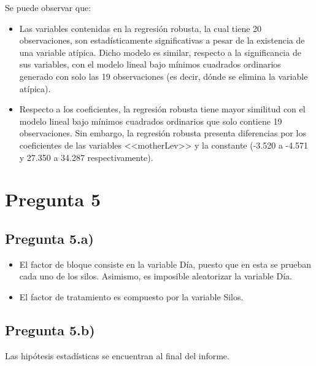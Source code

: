 \documentclass[10pt,a4paper]{article}\usepackage[]{graphicx}\usepackage[]{color}
\begin{document}
Se puede observar que:

\begin{itemize}
	\item Las variables contenidas en la regresión robusta, la cual tiene 20 observaciones, son estadísticamente significativas a pesar de la existencia de una variable atípica. Dicho modelo es similar, respecto a la significancia de sus variables, con el modelo lineal bajo mínimos cuadrados ordinarios generado con solo las 19 observaciones (es decir, dónde se elimina la variable atípica).
	\item Respecto a los coeficientes, la regresión robusta tiene mayor similitud con el modelo lineal bajo mínimos cuadrados ordinarios que solo contiene 19 observaciones. Sin embargo, la regresión robusta presenta diferencias por los coeficientes de las variables <<motherLev>> y la constante (-3.520 a -4.571 y 27.350 a 34.287 respectivamente).
\end{itemize}

\section{Pregunta 5}

\subsection{Pregunta 5.a)}
	\begin{itemize}
		\item El factor de bloque consiste en la variable Día, puesto que en esta se prueban cada uno de los silos. Asimismo, es imposible aleatorizar la variable Día.
		\item El factor de tratamiento es compuesto por la variable Silos.
	\end{itemize}
	
\subsection{Pregunta 5.b)}

Las hipótesis estadísticas se encuentran al final del informe.
\end{document}
